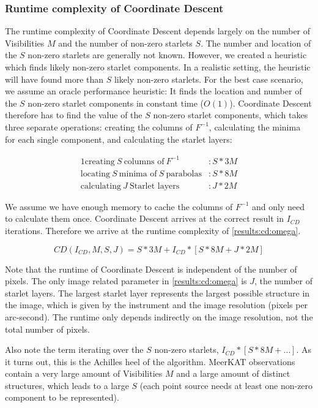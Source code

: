 \subsubsection{Runtime complexity of Coordinate Descent}
The runtime complexity of Coordinate Descent depends largely on the number of Visibilities $M$ and the number of non-zero starlets $S$. The number and location of the $S$ non-zero starlets are generally not known. However, we created a heuristic which finds likely non-zero starlet components. In a realistic setting, the heuristic will have found more than $S$ likely non-zero starlets. For the best case scenario, we assume an oracle performance heuristic: It finds the location and number of the $S$ non-zero starlet components in constant time ($O(1)$). Coordinate Descent therefore has to find the value of the $S$ non-zero starlet components, which takes three separate operations: creating the columns of $F^{-1}$, calculating the minima for each single component, and calculating the starlet layers:

\begin{alignat*}{1}
\text{creating} \:S\: \text{columns of}\: F^{-1} &: S*3M\\
\text{locating} \:S\: \text{minima of} \:S\: \text{parabolas} &: S*8M\\
\text{calculating} \:J\: \text{Starlet layers} &: J * 2M
\end{alignat*}

We assume we have enough memory to cache the columns of $F^{-1}$ and only need to calculate them once. Coordinate Descent arrives at the correct result in $I_{CD}$ iterations. Therefore we arrive at the runtime complexity of \eqref{results:cd:omega}.

\begin{equation}\label{results:cd:omega}
CD(I_{CD}, M, S, J) = S*3M + I_{CD} * [S * 8M + J * 2M]
\end{equation}

Note that the runtime of Coordinate Descent is independent of the number of pixels. The only image related parameter in \eqref{results:cd:omega} is $J$, the number of starlet layers. The largest starlet layer represents the largest possible structure in the image, which is given by the instrument and the image resolution (pixels per arc-second). The runtime only depends indirectly on the image resolution, not the total number of pixels.

Also note the term iterating over the $S$ non-zero starlets, $ I_{CD} * [S * 8M +\ldots]$. As it turns out, this is the Achilles heel of the algorithm. MeerKAT observations contain a very large amount of Visibilities $M$ and a large amount of distinct structures, which leads to a large $S$ (each point source needs at least one non-zero component to be represented). 


